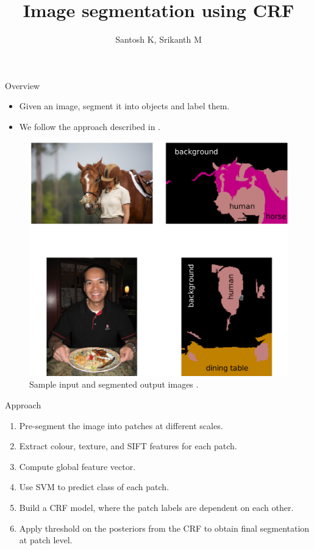 \documentclass{beamer}
\title{Image segmentation using CRF}
\author{Santosh K, Srikanth M}
\date{}
\begin{document}
\begin{frame}
  \titlepage
\end{frame}


\section{}

\begin{frame}{Overview}

\begin{itemize}
  \item Given an image, segment it into objects and label them.
  \item We follow the approach described in \cite{icml_2009}.
\end{itemize}

\begin{figure}[!hbp]
    \centering
    \includegraphics[width=0.5\linewidth]{images/ex}
    \caption{Sample input and segmented output images \cite{icml_2009}.}
    \label{fig_ex}
\end{figure}

\end{frame}

\begin{frame}{Approach}
  \begin{enumerate}
    \item Pre-segment the image into patches at different scales.
    \item Extract colour, texture, and SIFT features for each patch.
    \item Compute global feature vector.
    \item Use SVM to predict class of each patch.
    \item Build a CRF model, where the patch labels are dependent on each other.
    \item Apply threshold on the posteriors from the CRF to obtain final segmentation at patch level.        
  \end{enumerate}
\end{frame}
\end{document}

